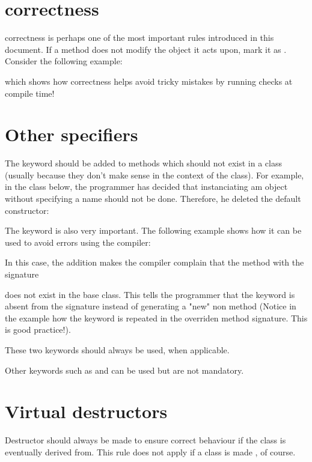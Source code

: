 
\section{ correctness}
 correctness is perhaps one of the most important rules introduced 
in this document. If a method does not modify the object it acts upon, mark it 
as . Consider the following example:

which shows how  correctness helps avoid tricky mistakes by running 
checks at compile time!

\section{Other specifiers}
The  keyword should be added to methods which should not exist in a 
class (usually because they don't make sense in the context of the class). For 
example, in the class  below, the programmer has decided that 
instanciating am object without specifying a name should not be done. 
Therefore, he deleted the default constructor:


The  keyword is also very important. The following example shows 
how it can be used to avoid errors using the compiler:

In this case, the  addition makes the compiler complain that the 
method with the signature

\begin{center}
\end{center}
does not exist in the base class. This tells the programmer that the 
 keyword is absent from the signature instead of generating a "new" 
non   method (Notice in the example how the keyword 
 is repeated in the overriden method signature. This is good 
practice!).

These two keywords should always be used, when applicable.

Other keywords such as  and  can be used but are not 
mandatory.

\section{Virtual destructors}
Destructor should always be made  to ensure correct behaviour if 
the class is eventually derived from. This rule does not apply if a class 
is made , of course.

